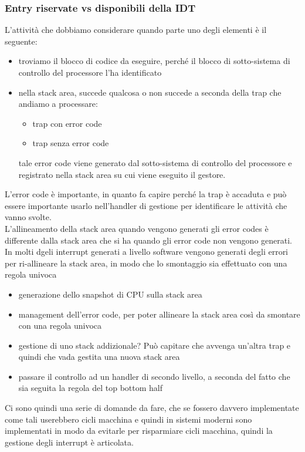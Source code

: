 \documentclass[12pt, oneside]{extbook}
\begin{document}
\subsubsection{Entry riservate vs disponibili della IDT}
L'attività che dobbiamo considerare quando parte uno degli elementi è il seguente:
\begin{itemize}
\item troviamo il blocco di codice da eseguire, perché il blocco di sotto-sistema di controllo del processore l'ha identificato
\item nella stack area, succede qualcosa o non succede a seconda della trap che andiamo a processare:
\begin{itemize}
\item trap con error code
\item trap senza error code
\end{itemize}
tale error code viene generato dal sotto-sistema di controllo del processore e registrato nella stack area su cui viene eseguito il gestore.
\end{itemize}
L'error code è importante, in quanto fa capire perché la trap è accaduta e può essere importante usarlo nell'handler di gestione per identificare le attività che vanno svolte.\\L'allineamento della stack area quando vengono generati gli error codes è differente dalla stack area che si ha quando gli error code non vengono generati. In molti dgeli interrupt generati a livello software vengono generati degli errori per ri-allineare la stack area, in modo che lo smontaggio sia effettuato con una regola univoca
\begin{itemize}
\item generazione dello snapshot di CPU sulla stack area
\item management dell'error code, per poter allineare la stack area così da smontare con una regola univoca
\item gestione di uno stack addizionale? Può capitare che avvenga un'altra trap e quindi che vada gestita una nuova stack area
\item passare il controllo ad un handler di secondo livello, a seconda del fatto che sia seguita la regola del top bottom half
\end{itemize}
Ci sono quindi una serie di domande da fare, che se fossero davvero implementate come tali userebbero cicli macchina e quindi in sistemi moderni sono implementati in modo da evitarle per risparmiare cicli macchina, quindi la gestione degli interrupt è articolata.
\end{document}
